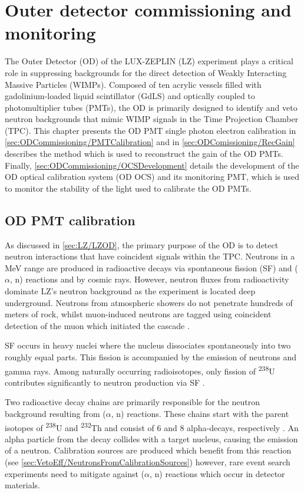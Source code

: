 \chapter{Outer detector commissioning and monitoring}\label{chap:ODCommissioning}
The Outer Detector (OD) of the LUX-ZEPLIN (LZ) experiment plays a critical role in suppressing backgrounds for the direct detection of Weakly Interacting Massive Particles (WIMPs). Composed of ten acrylic vessels filled with gadolinium-loaded liquid scintillator (GdLS) and optically coupled to photomultiplier tubes (PMTs), the OD is primarily designed to identify and veto neutron backgrounds that mimic WIMP signals in the Time Projection Chamber (TPC). This chapter presents the OD PMT single photon electron calibration in \autoref{sec:ODCommissioning/PMTCalibration} and in \autoref{sec:ODComissioning/RecGain} describes the method which is used to reconstruct the gain of the OD PMTs. Finally, \autoref{sec:ODCommissioning/OCSDevelopment} details the development of the OD optical calibration system (OD OCS) and its monitoring PMT, which is used to monitor the stability of the light used to calibrate the OD PMTs.

\section{OD PMT calibration}\label{sec:ODCommissioning/PMTCalibration}
As discussed in \autoref{sec:LZ/LZOD}, the primary purpose of the OD is to detect neutron interactions that have coincident signals within the TPC. Neutrons in a MeV range are produced in radioactive decays via spontaneous fission (SF) and ($\alpha$, n) reactions and by cosmic rays. However, neutron fluxes from radioactivity dominate LZ's neutron background as the experiment is located deep underground. Neutrons from atmospheric showers do not penetrate hundreds of meters of rock, whilst muon-induced neutrons are tagged using coincident detection of the muon which initiated the cascade \cite{LZ_SIMS}.

SF occurs in heavy nuclei where the nucleus dissociates spontaneously into two roughly equal parts. This fission is accompanied by the emission of neutrons and gamma rays. Among naturally occurring radioisotopes, only fission of \textsuperscript{238}U contributes significantly to neutron production via SF \cite{Kudryavtsev:2020eer}.

Two radioactive decay chains are primarily responsible for the neutron background resulting from ($\alpha$, n) reactions. These chains start with the parent isotopes of \textsuperscript{238}U and \textsuperscript{232}Th and consist of 6 and 8 alpha-decays, respectively \cite{Kudryavtsev:2020eer}. An alpha particle from the decay collides with a target nucleus, causing the emission of a neutron. Calibration sources are produced which benefit from this reaction (see \autoref{sec:VetoEff/NeutronsFromCalibrationSources}) however, rare event search experiments need to mitigate against ($\alpha$, n) reactions which occur in detector materials.

